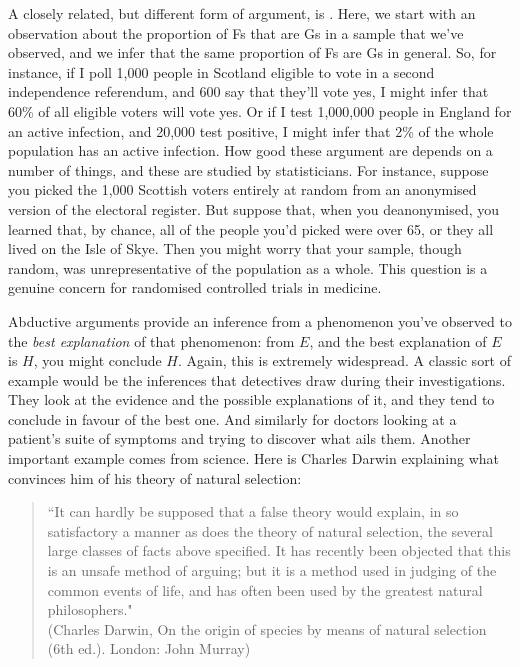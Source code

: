A closely related, but different form of argument, is . Here, we start with an observation about the proportion of Fs that are Gs in a sample that we've observed, and we infer that the same proportion of Fs are Gs in general. So, for instance, if I poll 1,000 people in Scotland eligible to vote in a second independence referendum, and 600 say that they'll vote yes, I might infer that 60\% of all eligible voters will vote yes. Or if I test 1,000,000 people in England for an active infection, and 20,000 test positive, I might infer that 2\% of the whole population has an active infection. How good these argument are depends on a number of things, and these are studied by statisticians. For instance, suppose you picked the 1,000 Scottish voters entirely at random from an anonymised version of the electoral register. But suppose that, when you deanonymised, you learned that, by chance, all of the people you'd picked were over 65, or they all lived on the Isle of Skye. Then you might worry that your sample, though random, was unrepresentative of the population as a whole. This question is a genuine concern for randomised controlled trials in medicine.

Abductive arguments provide an inference from a phenomenon you've observed to the \emph{best explanation} of that phenomenon: from $E$, and the best explanation of $E$ is $H$, you might conclude $H$. Again, this is extremely widespread. A classic sort of example would be the inferences that detectives draw during their investigations. They look at the evidence and the possible explanations of it, and they tend to conclude in favour of the best one. And similarly for doctors looking at a patient's suite of symptoms and trying to discover what ails them. Another important example comes from science. Here is Charles Darwin explaining what convinces him of his theory of natural selection:
\begin{quotation}
``It can hardly be supposed that a false theory would explain, in so satisfactory a manner as does the theory of natural selection, the several large classes of facts above specified. It has recently been objected that this is an unsafe method of arguing; but it is a method used in judging of the common events of life, and has often been used by the greatest natural philosophers."\\ (Charles Darwin, On the origin of species by means of natural selection (6th ed.).
London: John Murray)
\end{quotation}








